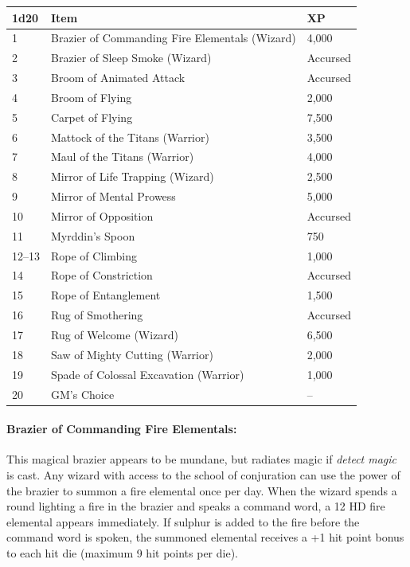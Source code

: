 \begin{multicols}{2}
\begin{minipage}{\columnwidth}
\label{tools}
\noindent \begin{tabular}{|p{}|p{}|p{}|}
\hline
1d20	& Item	& XP \\
\hline\hline
\rowcolor[gray]{.9}1	& Brazier of Commanding Fire Elementals (Wizard)	& 4,000 \\
2	& Brazier of Sleep Smoke (Wizard)	& Accursed \\
\rowcolor[gray]{.9}3	& Broom of Animated Attack	& Accursed \\
4	& Broom of Flying	& 2,000 \\
\rowcolor[gray]{.9}5	& Carpet of Flying	& 7,500 \\
6	& Mattock of the Titans (Warrior)	& 3,500 \\
\rowcolor[gray]{.9}7	& Maul of the Titans (Warrior)	& 4,000 \\
8	& Mirror of Life Trapping (Wizard)	& 2,500 \\
\rowcolor[gray]{.9}9	& Mirror of Mental Prowess	& 5,000 \\
10	& Mirror of Opposition	& Accursed \\
\rowcolor[gray]{.9}11	& Myrddin's Spoon	& 750 \\
12--13	& Rope of Climbing	& 1,000 \\
\rowcolor[gray]{.9}14	& Rope of Constriction	& Accursed \\
15	& Rope of Entanglement	& 1,500 \\
\rowcolor[gray]{.9}16	& Rug of Smothering	& Accursed \\
17	& Rug of Welcome (Wizard)	& 6,500 \\
\rowcolor[gray]{.9}18	& Saw of Mighty Cutting (Warrior)	& 2,000 \\
19	& Spade of Colossal Excavation (Warrior)	& 1,000 \\
\rowcolor[gray]{.9}20	& GM's Choice	& -- \\
\hline
\end{tabular}

\end{minipage}

\paragraph{Brazier of Commanding Fire Elementals:} This magical brazier appears to be mundane, but radiates magic if \textit{detect magic} is cast.  Any wizard with access to the school of conjuration can use the power of the brazier to summon a fire elemental once per day.  When the wizard spends a round lighting a fire in the brazier and speaks a command word, a 12 HD fire elemental appears immediately.  If sulphur is added to the fire before the command word is spoken, the summoned elemental receives a +1 hit point bonus to each hit die (maximum 9 hit points per die). 


\end{multicols}
